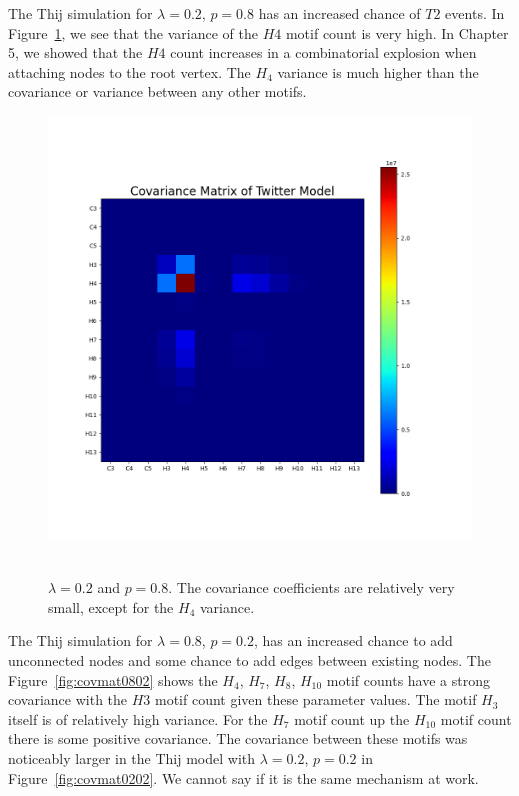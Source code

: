 The Thij simulation for $\lambda=0.2$, $p=0.8$ has an increased chance of $T2$ events. In Figure~\ref{fig:covmat0208},
we see that the variance of the $H4$ motif count is very high. In Chapter 5, we showed that the $H4$ count increases
in a combinatorial explosion when attaching nodes to the root vertex. The $H_4$ variance is much higher than the covariance
or variance between any other motifs.

\begin{figure}
    \includegraphics[width=0.9\linewidth]{Images/CovMatTwitterModel020809.png}\
    \centering
    \caption{$\lambda=0.2$ and $p=0.8$. The covariance coefficients are relatively 
    very small, except for the $H_{4}$ variance.}
    \label{fig:covmat0208}
\end{figure}



The Thij simulation for $\lambda=0.8$, $p=0.2$, has an increased chance to add unconnected nodes and some chance to 
add edges between existing nodes. The Figure~\ref{fig:covmat0802} shows the $H_4$, $H_7$, $H_8$, $H_{10}$ motif counts have a strong covariance
with the $H3$ motif count given these parameter values. The motif $H_3$ itself is of relatively high variance. For the $H_7$ motif count
up the $H_{10}$ motif count there is some positive covariance. The covariance between these motifs was noticeably larger in the 
Thij model with $\lambda=0.2$, $p=0.2$ in Figure~\ref{fig:covmat0202}. We cannot say if it is the same mechanism at work.


